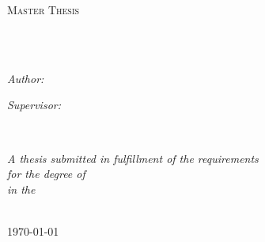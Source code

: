 \documentclass[
12pt, %
english, %
singlespacing, %
headsepline, %
]{MastersDoctoralThesis} %
\author{Sebastian \textsc{Carmona Estrada}} %
\begin{document}
\frontmatter %

\pagestyle{plain} %


\begin{titlepage}
\begin{center}

\vspace*{.06\textheight}
{\scshape\LARGE \univname\par}\vspace{1.5cm} %
\textsc{\Large Master Thesis}\\[0.5cm] %

\HRule \\[0.4cm] %
{\huge \bfseries \ttitle\par}\vspace{0.4cm} %
\HRule \\[1.5cm] %
 
\begin{minipage}[t]{0.4\textwidth}
\begin{flushleft} \large
\emph{Author:}\\
\href{scarmonae@eafit.edu.co}{\authorname} %
\end{flushleft}
\end{minipage}
\begin{minipage}[t]{0.4\textwidth}
\begin{flushright} \large
\emph{Supervisor:} \\
\href{olquinte1@eafit.edu.co}{\supname} %
\end{flushright}
\end{minipage}\\[3cm]
 
\vfill

\large \textit{A thesis submitted in fulfillment of the requirements\\ for the degree of \degreename}\\[0.3cm] %
\textit{in the}\\[0.4cm]
\deptname\\[2cm] %
 
\vfill

{\large \today}\\[4cm] %
 
\vfill
\end{center}
\end{titlepage}
\end{document}
